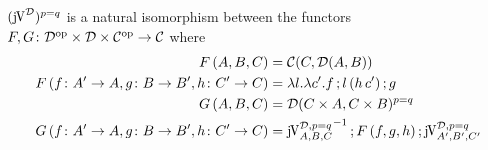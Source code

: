 \documentclass[runningheads,envcountsame]{llncs}
\begin{document}
\begin{lemma}
    $(\juncurry[\D])^{p=q}$ is a natural isomorphism between the functors $F, G\colon {\mathcal{D}^\mathrm{op}} \times \mathcal{D} \times {\mathcal{C}^\mathrm{op}} \to \mathcal{C}$ where 
    \begin{align}
        F\,(A, B, C) &= \homC{C}{\homD{A}{B}} \\
        F\,(f\colon A' \to A, g\colon B \to B', h\colon C' \to C) &= \lambda l. \lambda c'. \comp{f}{\comp{l\,(h\,c')}{g}} \\
        G\,(A, B, C) &= \homD{C \times A}{C \times B}^{p=q} \\
        G\,(f\colon A' \to A, g\colon B \to B', h\colon C' \to C) &= \comp{{\juncurry[\D, p=q]_{A, B, C}}^{-1}}{\comp{F\,(f, g, h)}{\juncurry[\D, p=q]_{A', B', C'}}}
    \end{align}
\end{lemma}
\end{document}

